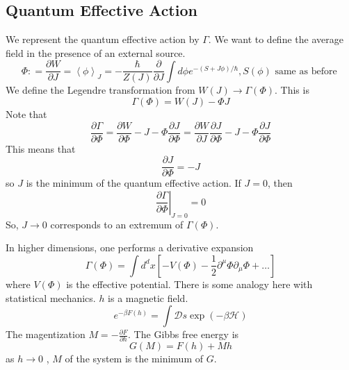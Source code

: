 \documentclass[11pt, oneside]{article}   	%
\theoremstyle{slanted}
\begin{document}
\subsection{Quantum Effective Action}
We represent the quantum effective action by $ \Gamma $. 
We want to define the 
average field in the 
presence of an external source. 
\[
	\Phi  : = \frac{\partial  W }{\partial  J } =  \left< \phi  \right> _ J 	=  - \frac{ \hbar }{ Z \left( J  \right) }
	\frac{\partial  }{\partial  J } \int d \phi e ^{  - \left(  S + J \phi  \right)   / \hbar } , S \left( 
	\phi \right)  \text{ same as before }
\] We define the Legendre transformation from $ W \left( J  \right)  
\to \Gamma \left( \Phi  \right)  $.
This is 
\[
	\Gamma ( \Phi ) = W \left(  J  \right)   - \Phi J 
\]  Note that 
\[
 \frac{\partial  \Gamma }{\partial  \Phi }   = 
 \frac{\partial  W }{\partial  \Phi }   - J -  \Phi \frac{\partial  J }{\partial  
 \Phi }   = \frac{\partial W }{\partial  J }  \frac{\partial  J }{\partial  \Phi }  
  - J  -\Phi \frac{\partial  J }{\partial  \Phi } 
\] This means 
that 
\[
 \frac{\partial  J }{\partial  \Phi }   = - J 
\] so $ J $ is the minimum of the quantum effective 
action. If $ J  = 0 $, then 
\[
 \left. \frac{\partial  \Gamma }{\partial  \Phi }  \right\vert_{ J  =0 }  = 0
\] So, $ J \to  0 $ corresponds to an 
extremum of $ \Gamma \left(  \Phi  \right)  $. 

In higher dimensions, 
one performs a derivative expansion 
\[
 \Gamma \left( \Phi   \right)   = 
 \int d ^ d x \left[   -V \left( \Phi  \right)  
  - \frac{1}{2 } \partial  ^ \mu \Phi \partial  _ \mu \Phi + \dots \right] 
\] where $ V \left( \Phi  \right)  $ is the effective potential. 
There is some analogy 
here with statistical mechanics. $ h $ is a magnetic field. 
\[
	e ^{  - \beta F (h  ) }  = \int \mathcal{ D } s \exp 
	( - \beta \mathcal{ H } )
\] The magentization 
$ M  = - \frac{\partial  F }{\partial  h }  $. The Gibbs free energy 
is \[
 G ( M  )  = F \left( h  \right)  + M h 
\] as $ h \to 0 $ , $ M $ of the system is the 
minimum of $ G $. 
\end{document}
